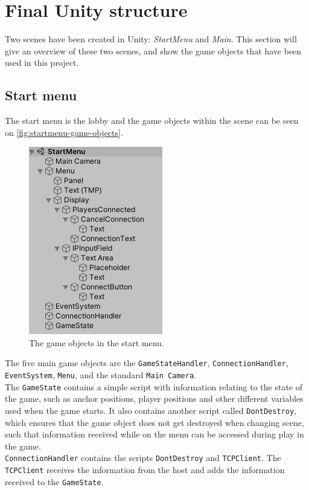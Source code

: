 \section{Final Unity structure}
Two scenes have been created in Unity: \textit{StartMenu} and \textit{Main}.
This section will give an overview of these two scenes, and show the game objects that have been used in this project.

\subsection{Start menu}
The start menu is the lobby and the game objects within the scene can be seen on \autoref{fig:startmenu-game-objects}.

\begin{figure}[H]
    \centering
    \includegraphics[width=0.4\linewidth]{figures/startmenu.PNG}
    \caption{The game objects in the start menu.}
    \label{fig:startmenu-game-objects}
\end{figure}
\noindent
The five main game objects are the \texttt{GameStateHandler}, \texttt{ConnectionHandler}, \texttt{EventSystem}, \texttt{Menu}, and the standard \texttt{Main Camera}.
\\
The \texttt{GameState} contains a simple script with information relating to the state of the game, such as anchor positions, player positions and other different variables used when the game starts.
It also contains another script called \texttt{DontDestroy}, which ensures that the game object does not get destroyed when changing scene, such that information received while on the menu can be accessed during play in the game.
\\
\texttt{ConnectionHandler} contains the scripts \texttt{DontDestroy} and \texttt{TCPClient}.
The \texttt{TCPClient} receives the information from the host and adds the information received to the \texttt{GameState}.
